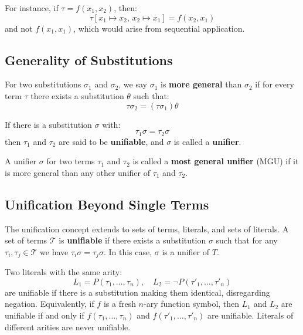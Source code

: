 For instance, if \(\tau = f(x_1, x_2)\), then:
\begin{equation}
\tau[x_1 \mapsto x_2, \, x_2 \mapsto x_1] = f(x_2, x_1)
\end{equation}
and not \(f(x_1, x_1)\), which would arise from sequential application.

\subsection{Generality of  Substitutions}
For two substitutions \(\sigma_1\) and \(\sigma_2\), we say \(\sigma_1\) is \textbf{more general} than \(\sigma_2\) if for every term \(\tau\) there exists a substitution \(\theta\) such that:
\begin{equation}  
  \tau\sigma_2 = (\tau\sigma_1)\theta
\end{equation}

If there is a substitution \(\sigma\) with:
\begin{equation}
\tau_1\sigma = \tau_2\sigma
\end{equation}
then \(\tau_1\) and \(\tau_2\) are said to be \textbf{unifiable}, and \(\sigma\) is called a \textbf{unifier}.

A unifier \(\sigma\) for two terms \(\tau_1\) and \(\tau_2\) is called a \textbf{most general unifier} (MGU) if it is more general than any other unifier of \(\tau_1\) and \(\tau_2\).

\subsection{Unification Beyond Single Terms}
The unification concept extends to sets of terms, literals, and sets of literals.  
A set of terms \(\mathcal{T}\) is \textbf{unifiable} if there exists a substitution \(\sigma\) such that for any \(\tau_i, \tau_j \in \mathcal{T}\) we have \(\tau_i\sigma = \tau_j\sigma\). In this case, \(\sigma\) is a unifier of \(T\).

Two literals with the same arity:
\begin{equation}
L_1 = P(\tau_1, \ldots, \tau_n), \quad L_2 = \neg P(\tau'_1, \ldots, \tau'_n)
\end{equation}
are unifiable if there is a substitution making them identical, disregarding negation. Equivalently, if \(f\) is a fresh \(n\)-ary function symbol, then \(L_1\) and \(L_2\) are unifiable if and only if \(f(\tau_1, \ldots, \tau_n)\) and \(f(\tau'_1, \ldots, \tau'_n)\) are unifiable.  
Literals of different arities are never unifiable.


